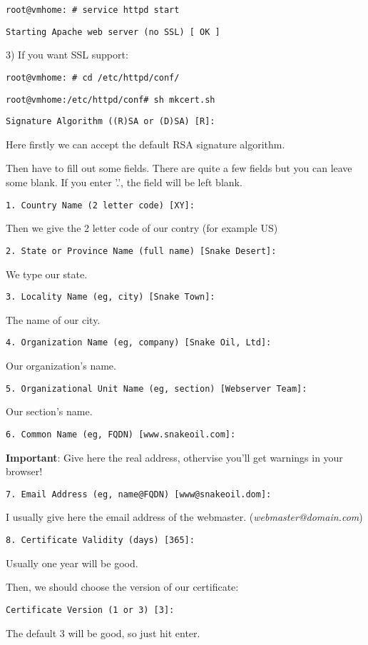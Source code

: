 {\tt root@vmhome:~# service httpd start}

{\tt Starting Apache web server (no SSL)        [  OK  ]}

3) If you want SSL support:

{\tt root@vmhome:~# cd /etc/httpd/conf/}

{\tt root@vmhome:/etc/httpd/conf# sh mkcert.sh}

{\tt Signature Algorithm ((R)SA or (D)SA) [R]:}

Here firstly we can accept the default RSA signature algorithm.

Then have to fill out some fields. There are quite a few fields but you can leave some blank.
If you enter '.', the field will be left blank.

{\tt 1. Country Name             (2 letter code) [XY]:}

Then we give the 2 letter code of our contry (for example US)

{\tt 2. State or Province Name   (full name)     [Snake Desert]:}

We type our state.

{\tt 3. Locality Name            (eg, city)      [Snake Town]:}

The name of our city.

{\tt 4. Organization Name        (eg, company)   [Snake Oil, Ltd]:}

Our organization's name.

{\tt 5. Organizational Unit Name (eg, section)   [Webserver Team]:}

Our section's name.

{\tt 6. Common Name              (eg, FQDN)      [www.snakeoil.com]:}

\textbf{Important}: Give here the real address, othervise you'll get warnings in your browser!

{\tt 7. Email Address            (eg, name@FQDN) [www@snakeoil.dom]:}

I usually give here the email address of the webmaster. (\textit{webmaster@domain.com})

{\tt 8. Certificate Validity     (days)          [365]:}

Usually one year will be good.

Then, we should choose the version of our certificate:

{\tt Certificate Version (1 or 3) [3]:}

The default 3 will be good, so just hit enter.

